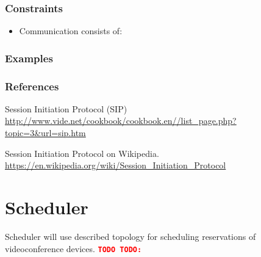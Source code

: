 \documentclass[a4paper]{report}
\newcommand{\TODO}[1]{%
\def\empty{}%
\def\prvniparametr{#1}%
\ifx\prvniparametr\empty%
\begingroup\tt\textcolor{red}{\noindent\textbf{TODO}}\endgroup
\else%
\begingroup\tt\textcolor{red}{\noindent\textbf{TODO:}\ #1}\endgroup
\fi%
}
\begin{document}
\subsection{Constraints}

\begin{itemize}

\item Communication consists of:

\end{itemize}

\subsection{Examples}

\subsection{References}

\renewcommand{\bibsection}{}
\begin{thebibliography}{1}

Session Initiation Protocol (SIP)
\\ \url{http://www.vide.net/cookbook/cookbook.en//list_page.php?topic=3&url=sip.htm}

Session Initiation Protocol on Wikipedia.
\\ \url{https://en.wikipedia.org/wiki/Session_Initiation_Protocol}

\end{thebibliography}


\chapter{Scheduler}

Scheduler will use described topology for scheduling reservations of videoconference devices.
\TODO{}
\end{document}
